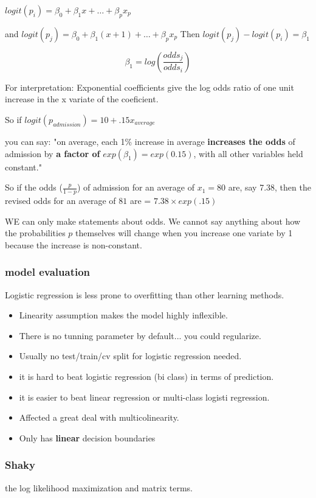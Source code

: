 \documentclass{article}
\begin{document}
$logit(p_i) = \beta_0 + \beta_1x + \dots + \beta_p x_p$

and 
$logit(p_j) = \beta_0 + \beta_1(x+1) + \dots + \beta_p x_p$
Then $logit(p_j)-logit(p_i) = \beta_1$

\[
\beta_1 = log(\frac{odds_j}{odds_i})
\]

For interpretation:
Exponential coefficients give the log odds ratio of one unit increase in the x variate of the coeficient.

So if $logit(p_{admission}) = 10+.15x_{average}$

you can say: "on average, each 1\% increase in average \textbf{increases the odds} of admission by \textbf{a factor of} $exp(\beta_1) = exp(0.15)$, with all other variables held constant."

So if the odds ($\frac{p}{1-p}$) of admission for an average of $x_1 = 80$ are, say 7.38, then the revised odds for an average of $81$ are = $7.38 \times exp(.15)$

WE can only make statements about odds. We cannot say anything about how the probabilities $p$ themselves will change when you increase one variate by 1 because the increase is non-constant. 

\subsubsection{model evaluation}
Logistic regression is less prone to overfitting than other learning methods.
\begin{itemize}
\item Linearity assumption makes the model highly inflexible.
\item There is no tunning parameter by default... you could regularize.
\item Usually no test/train/cv split for logistic regression needed.
\item it is hard to beat logistic regression (bi class) in terms of prediction. 
\item it is easier to beat linear regression or multi-class logisti regression.
\item Affected a great deal with multicolinearity.
\item Only has \textbf{linear} decision boundaries 
\end{itemize}

\subsubsection{Shaky}
the log likelihood maximization and matrix terms.
\end{document}
